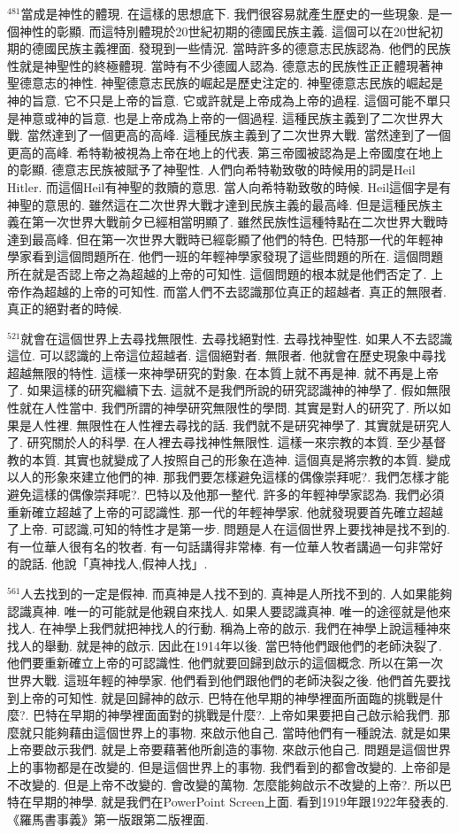 \documentclass{book}
\begin{document}
$^{481}$當成是神性的體現.
在這樣的思想底下.
我們很容易就產生歷史的一些現象.
是一個神性的彰顯.
而這特別體現於20世紀初期的德國民族主義.
這個可以在20世紀初期的德國民族主義裡面.
發現到一些情況.
當時許多的德意志民族認為.
他們的民族性就是神聖性的終極體現.
當時有不少德國人認為.
德意志的民族性正正體現著神聖德意志的神性.
神聖德意志民族的崛起是歷史注定的.
神聖德意志民族的崛起是神的旨意.
它不只是上帝的旨意.
它或許就是上帝成為上帝的過程.
這個可能不單只是神意或神的旨意.
也是上帝成為上帝的一個過程.
這種民族主義到了二次世界大戰.
當然達到了一個更高的高峰.
這種民族主義到了二次世界大戰.
當然達到了一個更高的高峰.
希特勒被視為上帝在地上的代表.
第三帝國被認為是上帝國度在地上的彰顯.
德意志民族被賦予了神聖性.
人們向希特勒致敬的時候用的詞是Heil Hitler.
而這個Heil有神聖的救贖的意思.
當人向希特勒致敬的時候.
Heil這個字是有神聖的意思的.
雖然這在二次世界大戰才達到民族主義的最高峰.
但是這種民族主義在第一次世界大戰前夕已經相當明顯了.
雖然民族性這種特點在二次世界大戰時達到最高峰.
但在第一次世界大戰時已經彰顯了他們的特色.
巴特那一代的年輕神學家看到這個問題所在.
他們一班的年輕神學家發現了這些問題的所在.
這個問題所在就是否認上帝之為超越的上帝的可知性.
這個問題的根本就是他們否定了.
上帝作為超越的上帝的可知性.
而當人們不去認識那位真正的超越者.
真正的無限者.
真正的絕對者的時候.

$^{521}$就會在這個世界上去尋找無限性.
去尋找絕對性.
去尋找神聖性.
如果人不去認識這位.
可以認識的上帝這位超越者.
這個絕對者.
無限者.
他就會在歷史現象中尋找超越無限的特性.
這樣一來神學研究的對象.
在本質上就不再是神.
就不再是上帝了.
如果這樣的研究繼續下去.
這就不是我們所說的研究認識神的神學了.
假如無限性就在人性當中.
我們所謂的神學研究無限性的學問.
其實是對人的研究了.
所以如果是人性裡.
無限性在人性裡去尋找的話.
我們就不是研究神學了.
其實就是研究人了.
研究關於人的科學.
在人裡去尋找神性無限性.
這樣一來宗教的本質.
至少基督教的本質.
其實也就變成了人按照自己的形象在造神.
這個真是將宗教的本質.
變成以人的形象來建立他們的神.
那我們要怎樣避免這樣的偶像崇拜呢?.
我們怎樣才能避免這樣的偶像崇拜呢?.
巴特以及他那一整代.
許多的年輕神學家認為.
我們必須重新確立超越了上帝的可認識性.
那一代的年輕神學家.
他就發現要首先確立超越了上帝.
可認識,可知的特性才是第一步.
問題是人在這個世界上要找神是找不到的.
有一位華人很有名的牧者.
有一句話講得非常棒.
有一位華人牧者講過一句非常好的說話.
他說「真神找人,假神人找」.

$^{561}$人去找到的一定是假神.
而真神是人找不到的.
真神是人所找不到的.
人如果能夠認識真神.
唯一的可能就是他親自來找人.
如果人要認識真神.
唯一的途徑就是他來找人.
在神學上我們就把神找人的行動.
稱為上帝的啟示.
我們在神學上說這種神來找人的舉動.
就是神的啟示.
因此在1914年以後.
當巴特他們跟他們的老師決裂了.
他們要重新確立上帝的可認識性.
他們就要回歸到啟示的這個概念.
所以在第一次世界大戰.
這班年輕的神學家.
他們看到他們跟他們的老師決裂之後.
他們首先要找到上帝的可知性.
就是回歸神的啟示.
巴特在他早期的神學裡面所面臨的挑戰是什麼?.
巴特在早期的神學裡面面對的挑戰是什麼?.
上帝如果要把自己啟示給我們.
那麼就只能夠藉由這個世界上的事物.
來啟示他自己.
當時他們有一種說法.
就是如果上帝要啟示我們.
就是上帝要藉著他所創造的事物.
來啟示他自己.
問題是這個世界上的事物都是在改變的.
但是這個世界上的事物.
我們看到的都會改變的.
上帝卻是不改變的.
但是上帝不改變的.
會改變的萬物.
怎麼能夠啟示不改變的上帝?.
所以巴特在早期的神學.
就是我們在PowerPoint Screen上面.
看到1919年跟1922年發表的.
《羅馬書事義》第一版跟第二版裡面.
\end{document}
